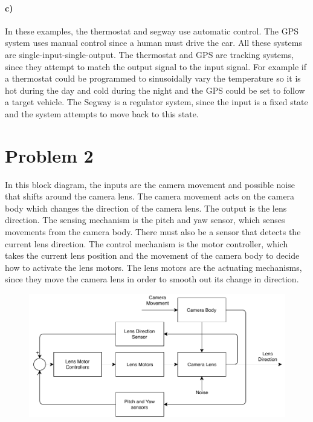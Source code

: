 \documentclass[12pt]{article}
\begin{document}
\paragraph{c)}

In these examples, the thermostat and segway use automatic control. The GPS system uses manual control since a human must
drive the car. All these systems are single-input-single-output. The thermostat and GPS are tracking systems, since they
attempt to match the output signal to the input signal. For example if a thermostat could be programmed to sinusoidally vary
the temperature so it is hot during the day and cold during the night and the GPS could be set to follow a target vehicle.
The Segway is a regulator system, since the input is a fixed state and the system attempts to move back to this state.

\section*{Problem 2}

In this block diagram, the inputs are the camera movement and possible noise that shifts around the camera lens. The camera
movement acts on the camera body which changes the direction of the camera lens. The output is the lens direction. The sensing
mechanism is the pitch and yaw sensor, which senses movements from the camera body. There must also be a sensor that detects
the current lens direction. The control mechanism is the motor controller, which takes the current lens position and the
movement of the camera body to decide how to activate the lens motors. The lens motors are the actuating mechanisms, since
they move the camera lens in order to smooth out its change in direction.
\begin{figure}[H]
    \begin{center}
        \includegraphics[width=5in]{Camera.pdf}
    \end{center}
\end{figure}
\end{document}

